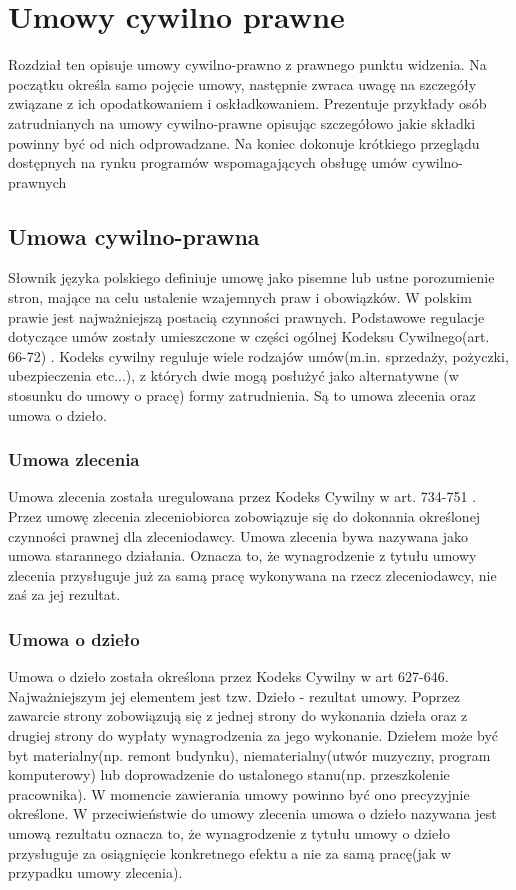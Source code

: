 \chapter{Umowy cywilno prawne}
Rozdział ten opisuje umowy cywilno-prawno z prawnego punktu widzenia. Na początku określa samo pojęcie umowy, następnie zwraca uwagę na szczegóły związane z ich opodatkowaniem i oskładkowaniem. Prezentuje przykłady osób zatrudnianych na umowy cywilno-prawne opisując szczegółowo jakie składki powinny być od nich odprowadzane. Na koniec dokonuje krótkiego przeglądu dostępnych na rynku programów wspomagających obsługę umów cywilno-prawnych

\section[Umowa cywilno-prawna][Umowa cywilno-prawna]{Umowa cywilno-prawna}
Słownik języka polskiego \cite{TODO} definiuje umowę jako pisemne lub ustne porozumienie stron, mające na celu ustalenie wzajemnych praw i obowiązków. W polskim prawie jest najważniejszą postacią czynności prawnych. Podstawowe regulacje dotyczące umów zostały umieszczone w części ogólnej Kodeksu Cywilnego(art. 66-72) \cite{TODO}. Kodeks cywilny reguluje wiele rodzajów umów(m.in. sprzedaży, pożyczki, ubezpieczenia etc...), z których dwie mogą posłużyć jako alternatywne (w stosunku do umowy o pracę) formy zatrudnienia. Są to umowa zlecenia oraz umowa o dzieło.

\subsection[Umowa zlecenia][Umowa zlecenia]{Umowa zlecenia}
Umowa zlecenia została uregulowana przez Kodeks Cywilny w art. 734-751 \cite{TODO}. Przez umowę zlecenia zleceniobiorca zobowiązuje się do dokonania określonej czynności prawnej dla zleceniodawcy. Umowa zlecenia bywa nazywana jako umowa starannego działania. Oznacza to, że wynagrodzenie z tytułu umowy zlecenia przysługuje już za samą pracę wykonywana na rzecz zleceniodawcy, nie zaś za jej rezultat.

\subsection[Umowa o dzieło][Umowa o dzieło]{Umowa o dzieło}
Umowa o dzieło została określona przez Kodeks Cywilny w art 627-646\cite{TODO}. Najważniejszym jej elementem jest tzw. Dzieło - rezultat umowy. Poprzez zawarcie strony zobowiązują się z jednej strony do wykonania dzieła oraz z drugiej strony do wypłaty wynagrodzenia za jego wykonanie. Dziełem może być byt materialny(np. remont budynku), niematerialny(utwór muzyczny, program komputerowy) lub doprowadzenie do ustalonego stanu(np. przeszkolenie pracownika). W momencie zawierania umowy powinno być ono precyzyjnie określone. W przeciwieństwie do umowy zlecenia umowa o dzieło nazywana jest umową rezultatu oznacza to, że wynagrodzenie z tytułu umowy o dzieło przysługuje za osiągnięcie konkretnego efektu a nie za samą pracę(jak w przypadku umowy zlecenia).

